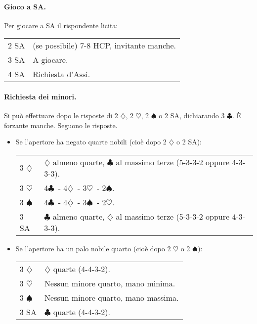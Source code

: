 \documentclass[a4paper,10pt]{article}
\renewcommand{\c}{$\clubsuit$\xspace}
\renewcommand{\d}{$\diamondsuit$\xspace}
\newcommand{\h}{$\heartsuit$\xspace}
\newcommand{\s}{$\spadesuit$\xspace}
\newcommand{\sa}{SA\xspace}
\newcommand{\smallspace}{\vskip0.3cm}
\newenvironment{twocol}
  {\smallspace\noindent\begin{tabular}{l p{0.8\textwidth}}}
  {\end{tabular}\smallspace}
\begin{document}
\paragraph{Gioco a SA.}
Per giocare a SA il rispondente licita:
\begin{twocol}
 2 \sa & (se possibile) 7-8 HCP, invitante manche.\\
 3 \sa & A giocare.\\
 4 \sa & Richiesta d'Assi.
\end{twocol}

\paragraph{Richiesta dei minori.} Si può effettuare dopo le risposte di 2 \d, 2 \h, 2 \s o 2 \sa, dichiarando 3 \c. È forzante manche. Seguono le risposte.

\begin{itemize}
 \item Se l'apertore ha negato quarte nobili (cioè dopo 2 \d o 2 \sa):
  \begin{twocol}
    3 \d & \d almeno quarte, \c al massimo terze (5-3-3-2 oppure 4-3-3-3).\\
    3 \h & 4\c\ - 4\d\ - 3\h\ - 2\s.\\
    3 \s & 4\c\ - 4\d\ - 3\s\ - 2\h.\\
    3 \sa & \c almeno quarte, \d al massimo terze (5-3-3-2 oppure 4-3-3-3).
  \end{twocol}

 \item Se l'apertore ha un palo nobile quarto (cioè dopo 2 \h o 2 \s):
  \begin{twocol}
    3 \d & \d quarte (4-4-3-2).\\
    3 \h & Nessun minore quarto, mano minima.\\
    3 \s & Nessun minore quarto, mano massima.\\
    3 \sa & \c quarte (4-4-3-2).
  \end{twocol}
\end{itemize}
\end{document}
